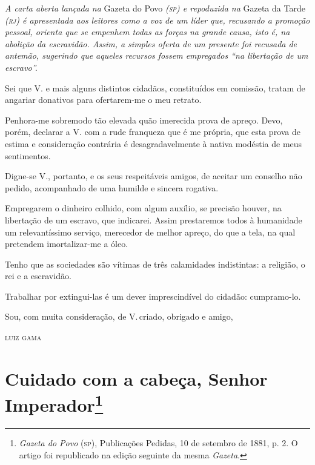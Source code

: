 \begin{resumo}
\emph{A carta aberta lançada na} Gazeta do Povo \emph{(\textsc{sp}) e repoduzida
na} Gazeta da Tarde \emph{(\textsc{rj}) é apresentada aos leitores como a voz de
um líder que, recusando a promoção pessoal, orienta que se empenhem todas
as forças na grande causa, isto é, na abolição da escravidão. Assim, a
simples oferta de um presente foi recusada de antemão, sugerindo que
aqueles recursos fossem empregados ``na libertação de um escravo''. }
\end{resumo}

Sei que V. e mais alguns distintos cidadãos, constituídos em comissão, tratam de angariar donativos para ofertarem-me o meu retrato.

Penhora-me sobremodo tão elevada quão imerecida prova de apreço. Devo,
porém, declarar a V. com a rude franqueza que é me própria, que esta
prova de estima e consideração contrária é desagradavelmente à nativa
modéstia de meus sentimentos.

Digne-se V., portanto, e os seus respeitáveis amigos, de aceitar um
conselho não pedido, acompanhado de uma humilde e sincera rogativa.

Empregarem o dinheiro colhido, com algum auxílio, se precisão houver, na
libertação de um escravo, que indicarei. Assim prestaremos todos à
humanidade um relevantíssimo serviço, merecedor de melhor apreço, do que
a tela, na qual pretendem imortalizar-me a óleo.

Tenho que as sociedades são vítimas de três calamidades indistintas: a
religião, o rei e a escravidão.

Trabalhar por extingui-las é um dever imprescindível do cidadão:
cumpramo-lo.

Sou, com muita consideração, de V.\,criado, obrigado e amigo,\medskip

\hfill\textsc{luiz gama}

\chapter{Cuidado com a cabeça, Senhor Imperador\footnote{
\emph{Gazeta do Povo} (\textsc{sp}), Publicações Pedidas, 10 de setembro de 1881, p. 2. O
  artigo foi republicado na edição seguinte da mesma \emph{Gazeta}.}}

